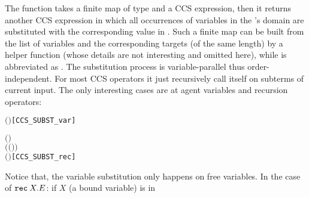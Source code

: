 The function  takes a finite
map  of type  and a CCS expression,
then it returns another CCS expression in which
all occurrences of variables in the 's domain are substituted with
the corresponding value in . Such a finite map can be built from
the list of variables  and the corresponding targets
 (of the same length) by a helper function  (whose details are
not interesting and omitted here), while
 is
abbreviated as .
The substitution process is
variable-parallel thus order-independent. For most CCS operators it
just recursively call itself on subterms of current input. The only
interesting cases are at agent variables and recursion operators:
\begin{alltt}
     \ensuremath{(} \ensuremath{)} \HOLSymConst{\HOLTokenDefEquality{}}   \HOLSymConst{\HOLTokenIn{}}         \hfill{[CCS_SUBST_var]}

     \ensuremath{(}  \ensuremath{)} \HOLSymConst{\HOLTokenDefEquality{}}
       \HOLSymConst{\HOLTokenIn{}}      \ensuremath{(} \ensuremath{(} \HOLSymConst{\ensuremath{\setminus}} \ensuremath{)} \ensuremath{)}
        \ensuremath{(}  \ensuremath{)}\hfill{[CCS_SUBST_rec]}
\end{alltt}
Notice that, the variable substitution only happens on free
variables. In the case of ${\tt rec}\: X . E$: if $X$ (a bound variable) is in
